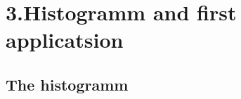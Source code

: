 \chapter{3.Histogramm and first applicatsion}
\section{The histogramm}

\begin{definition}[histogram]

\end{definition}

